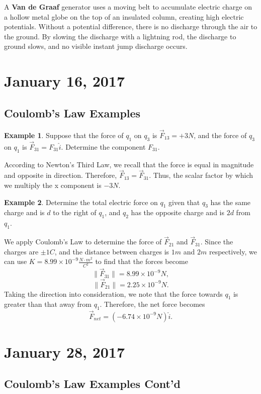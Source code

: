 \documentclass[11pt]{article}
\theoremstyle{plain} %
\theoremstyle{definition}
\theoremstyle{example}
\newtheorem*{example}{Example}
\theoremstyle{remark}
\begin{document}
A \textbf{Van de Graaf} generator uses a moving belt to accumulate electric charge on a hollow metal globe on the top of an insulated column, creating high electric potentials. Without a potential difference, there is no discharge through the air to the ground. By slowing the discharge with a lightning rod, the discharge to ground slows, and no visible instant jump discharge occurs. 

\section{January 16, 2017}
\subsection{Coulomb's Law Examples}

\begin{example}
Suppose that the force of $q_1$ on $q_3$ is $\vec{F}_{13} = +3N$, and the force of $q_3$ on $q_1$ is $\vec{F}_{31} = F_{31}\hat{i}$. Determine the component $F_{31}$.
\end{example}

According to Newton's Third Law, we recall that the force is equal in magnitude and opposite in direction. Therefore, $\vec{F}_{13} = \vec{F}_{31}$. Thus, the scalar factor by which we multiply the x component is $-3N$. 

\begin{example}
Determine the total electric force on $q_1$ given that $q_3$ has the same charge and is $d$ to the right of $q_1$, and $q_2$ has the opposite charge and is $2d$ from $q_1$.
\end{example}

We apply Coulomb's Law to determine the force of $\vec{F}_{21}$ and $\vec{F}_{31}$. Since the charges are $\pm 1 C$, and the distance between charges is $1m$ and $2m$ respectively, we can use $K = 8.99\times10^{-9}\frac{N\cdot m^2}{C^2}$ to find that the forces become
$$\|\vec{F}_{31}\| = 8.99\times10^{-9}N,$$
$$\|\vec{F}_{21}\| =2.25\times10^{-9}N.$$
Taking the direction into consideration, we note that the force towards $q_1$ is greater than that away from $q_1$. Therefore, the net force becomes 
$$\vec{F}_{net} = \left(-6.74\times10^{-9}N\right)\hat{i}.$$

\section{January 28, 2017}
\subsection{Coulomb's Law Examples Cont'd}
\end{document}
